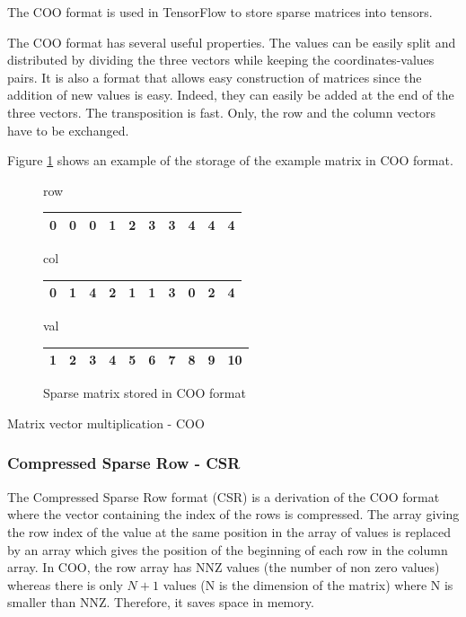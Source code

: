 The COO format is used in TensorFlow to store sparse matrices into tensors.

The COO format has several useful properties.
The values can be easily split and distributed by dividing the three vectors while keeping the coordinates-values pairs.
It is also a format that allows easy construction of matrices since the addition of new values is easy.
Indeed, they can easily be added at the end of the three vectors.
The transposition is fast.
Only, the row and the column vectors have to be exchanged.

Figure \ref{fig:methods:coo_ex} shows an example of the storage of the example matrix in COO format.

\begin{figure}
\centering
row
\bigskip
\begin{tabular}{|cccccccccc|}
\hline
0 & 0 & 0 & 1 & 2 & 3 & 3 & 4 & 4 & 4  \\
\hline
\end{tabular}

col
\bigskip
\begin{tabular}{|cccccccccc|}
\hline
0 & 1 & 4 & 2 & 1 & 1 & 3 & 0 & 2 & 4 \\
\hline
\end{tabular}

val
\bigskip
\begin{tabular}{|cccccccccc|}
\hline
1 & 2 & 3 & 4 & 5 & 6 & 7 & 8 & 9 & 10 \\
\hline
\end{tabular}
\caption{Sparse matrix stored in COO format \label{fig:methods:coo_ex}}
\end{figure}

\begin{algorithm}[h]
	\DontPrintSemicolon
	\caption{Matrix vector multiplication - COO\label{fig:methods:coo_algo}}
\end{algorithm}

\subsubsection{Compressed Sparse Row - CSR}
The Compressed Sparse Row format (CSR) \cite{HacBG1971} \cite{Gusta1972} is a derivation of the COO format where the vector containing the index of the rows is compressed.
The array giving the row index of the value at the same position in the array of values is replaced by an array which gives the position of the beginning of each row in the column array.
In COO, the row array has NNZ values (the number of non zero values) whereas there is only $N+1$ values (N is the dimension of the matrix) where N is smaller than NNZ.
Therefore, it saves space in memory.

